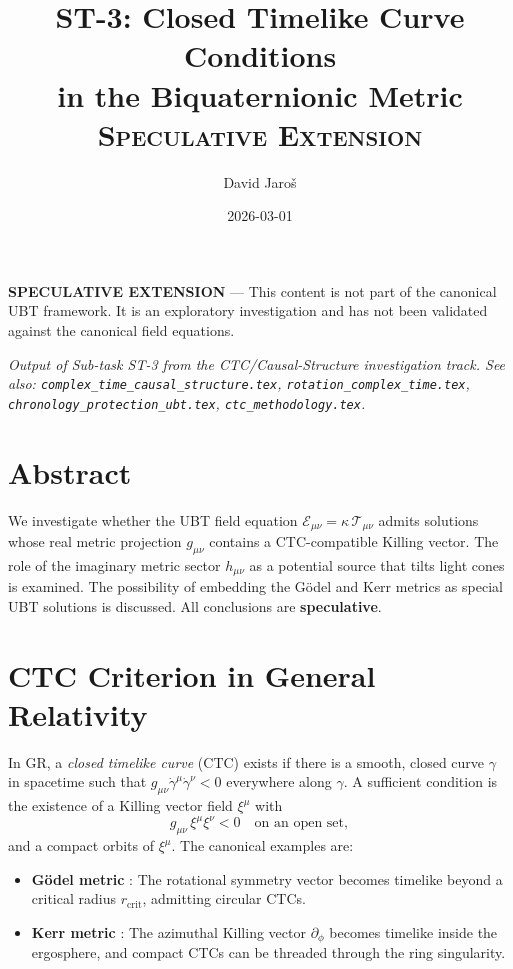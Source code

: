 \documentclass[12pt]{article}
\title{ST-3: Closed Timelike Curve Conditions\\
in the Biquaternionic Metric\\[0.5em]
\large\textsc{Speculative Extension}}
\author{David Jaroš}
\date{2026-03-01}
\begin{document}
\maketitle

\begin{tcolorbox}[colback=yellow!10, title=Status]
\textbf{SPECULATIVE EXTENSION} — This content is not part of
the canonical UBT framework. It is an exploratory investigation
and has not been validated against the canonical field equations.
\end{tcolorbox}

\vspace{1em}
\noindent\textit{Output of Sub-task ST-3 from the CTC/Causal-Structure investigation track.
See also: \texttt{complex\_time\_causal\_structure.tex},
\texttt{rotation\_complex\_time.tex},
\texttt{chronology\_protection\_ubt.tex}, \texttt{ctc\_methodology.tex}.}

\section*{Abstract}
We investigate whether the UBT field equation
$\mathcal{E}_{\mu\nu} = \kappa\,\mathcal{T}_{\mu\nu}$
admits solutions whose real metric projection $g_{\mu\nu}$ contains a
CTC-compatible Killing vector.  The role of the imaginary metric sector
$h_{\mu\nu}$ as a potential source that tilts light cones is examined.
The possibility of embedding the Gödel and Kerr metrics as special UBT
solutions is discussed.  All conclusions are \textbf{speculative}.

\section{CTC Criterion in General Relativity}
In GR, a \emph{closed timelike curve} (CTC) exists if there is a smooth,
closed curve $\gamma$ in spacetime such that $g_{\mu\nu}\dot\gamma^\mu
\dot\gamma^\nu < 0$ everywhere along $\gamma$.  A sufficient condition is
the existence of a Killing vector field $\xi^\mu$ with
\begin{equation}
  g_{\mu\nu}\,\xi^\mu\xi^\nu < 0 \quad \text{on an open set},
  \label{eq:ctc_gr}
\end{equation}
and a compact orbits of $\xi^\mu$.  The canonical examples are:
\begin{itemize}
  \item \textbf{Gödel metric} \cite{Godel1949}: The rotational symmetry
    vector becomes timelike beyond a critical radius $r_\mathrm{crit}$,
    admitting circular CTCs.
  \item \textbf{Kerr metric} \cite{Kerr1963}: The azimuthal Killing
    vector $\partial_\phi$ becomes timelike inside the ergosphere,
    and compact CTCs can be threaded through the ring singularity.
\end{itemize}
\end{document}
